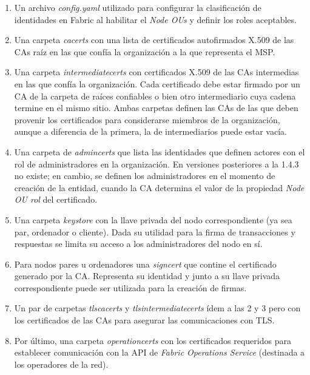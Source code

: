 \begin{enumerate}
	\item Un archivo \emph{config.yaml} utilizado para configurar la clasificaci\'on de identidades en Fabric al habilitar el \emph{Node OUs} y definir los roles aceptables.
	
	
	\item Una carpeta \emph{cacerts} con una lista de certificados autofirmados X.509 de las CAs ra\'iz en las que conf\'ia la organizaci\'on a la que representa el MSP.
	
	\item Una carpeta \emph{intermediatecerts} con certificados X.509 de las CAs intermedias en las que conf\'ia la organizaci\'on. Cada certificado debe estar firmado por un CA de la carpeta de ra\'ices confiables o bien otro intermediario cuya cadena termine en el mismo sitio. Ambas carpetas definen las CAs de las que deben provenir los certificados para considerarse miembros de la organizaci\'on, aunque a diferencia de la primera, la de intermediarios puede estar vac\'ia.
	
	\item Una carpeta de \emph{admincerts} que lista las identidades que definen actores con el rol de administradores en la organizaci\'on. En versiones posteriores a la 1.4.3 no existe; en cambio, se definen los administradores en el momento de creaci\'on de la entidad, cuando la CA determina el valor de la propiedad \emph{Node OU rol} del certificado.
	
	
	\item Una carpeta \emph{keystore} con la llave privada del nodo correspondiente (ya sea par, ordenador o cliente). Dada su utilidad para la firma de transacciones y respuestas se limita su acceso a los administradores del nodo en s\'i. 
	
	\item Para nodos pares u ordenadores una \emph{signcert} que contine el certificado generado por la CA. Representa su identidad y junto a su llave privada correspondiente puede ser utilizada para la creaci\'on de firmas.
	
	\item Un par de carpetas \emph{tlscacerts} y \emph{tlsintermediatecerts} \'idem a las 2 y 3 pero con los certificados de las CAs para asegurar las comunicaciones con TLS.
	
	\item Por \'ultimo, una carpeta \emph{operationcerts} con los certificados requeridos para establecer comunicaci\'on con la API de \emph{Fabric Operations Service} (destinada a los operadores de la red).
\end{enumerate}

